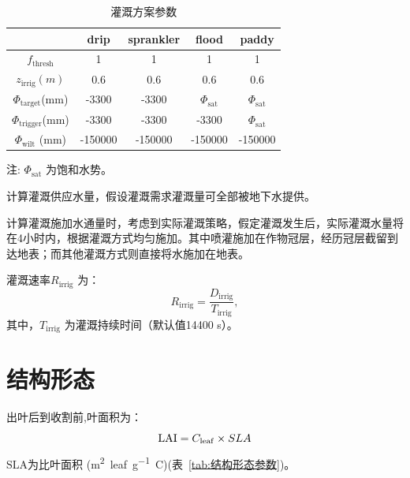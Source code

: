\begin{table}[htbp]
  \centering
  \caption{灌溉方案参数}
  \label{tab:灌溉方案参数}
  \begin{threeparttable}
    \begin{tabular}{@{}ccccc}
      \toprule
                                    & drip    & sprankler & flood                 & paddy                 \\ \midrule
      $f_{\mathrm{thresh}}$         & 1       & 1         & 1                     & 1                     \\
      $z_{\mathrm{irrig}}(m)$       & 0.6     & 0.6       & 0.6                   & 0.6                   \\
      $\Phi_{\mathrm{target}}$(mm)  & -3300   & -3300     & $\Phi_{\mathrm{sat}}$ & $\Phi_{\mathrm{sat}}$ \\
      $\Phi_{\mathrm{trigger}}$(mm) & -3300   & -3300     & -3300                 & $\Phi_{\mathrm{sat}}$ \\
      $\Phi_{\mathrm{wilt}}$ (mm)   & -150000 & -150000   & -150000               & -150000               \\ \bottomrule
    \end{tabular}
    \begin{tablenotes}
      \footnotesize
    \item[注:] $\Phi_{\mathrm{sat}}$ 为饱和水势。
    \end{tablenotes}
  \end{threeparttable}
\end{table}

计算灌溉供应水量，假设灌溉需求灌溉量可全部被地下水提供。

计算灌溉施加水通量时，考虑到实际灌溉策略，假定灌溉发生后，实际灌溉水量将在4小时内，根据灌溉方式均匀施加。其中喷灌施加在作物冠层，经历冠层截留到达地表；而其他灌溉方式则直接将水施加在地表。

灌溉速率$R_{\mathrm{irrig}}$ 为：
\begin{equation}
  R_{\mathrm{irrig}} = \frac{D_{\mathrm{irrig}}}{T_{\mathrm{irrig}}},
\end{equation}
其中，$T_{\mathrm{irrig}}$ 为灌溉持续时间（默认值14400 s）。
\section{结构形态}
出叶后到收割前,叶面积为：
\begin{equation}
  {\rm LAI}=C_{\mathrm{leaf}} \times SLA
\end{equation}
SLA为比叶面积 (\unit{m^2.leaf.g^{-1}.C})(表~\ref{tab:结构形态参数})。

